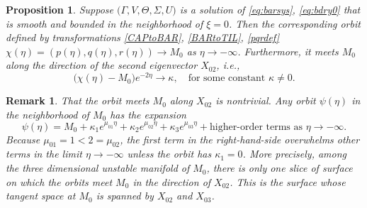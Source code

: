 \documentclass[a4paper,11pt]{article}
\newtheorem{proposition}{Proposition}[section]
\newtheorem{remark}{Remark}[section]
\begin{document}
\begin{proposition}
    Suppose $\big(\Gamma,V,\Theta,\Sigma,U\big)$ is a solution of \eqref{eq:barsys}, \eqref{eq:bdry0} that is smooth and bounded in the neighborhood of $\xi=0$. Then the corresponding orbit defined by transformations \eqref{CAPtoBAR}, \eqref{BARtoTIL}, \eqref{pqrdef} $\chi(\eta) = (p(\eta), q(\eta), r(\eta)) \rightarrow M_0$ as $\eta \rightarrow -\infty$. Furthermore, it meets $M_0$ along the direction of the second eigenvector $X_{02}$, i.e.,
    \begin{equation} \label{eq:alpha}
     \big(\chi(\eta) - M_0 \big)e^{-2\eta} \rightarrow \kappa, \quad \text{for some constant $\kappa\ne0$.}
    \end{equation}
\end{proposition}

\begin{remark} \label{rem:alpha}
  That the orbit meets $M_0$ along $X_{02}$ is nontrivial. Any orbit $\psi(\eta)$ in the neighborhood of $M_0$ has the expansion
  $$  \psi(\eta) = M_0 + \kappa_1 e^{\mu_{01}\eta} + \kappa_2 e^{\mu_{02}\eta} + \kappa_3 e^{\mu_{03}\eta} + \text{higher-order terms as $\eta \rightarrow -\infty$}.$$
  Because $\mu_{01}=1<2=\mu_{02}$, the first term in the right-hand-side overwhelms other terms in the limit $\eta \rightarrow -\infty$ unless the orbit has $\kappa_1=0$. More precisely, among the three dimensional unstable manifold of $M_0$, there is only one slice of surface on which the orbits meet $M_0$ in the direction of $X_{02}$. This is the surface whose tangent space at $M_0$ is spanned by $X_{02}$ and $X_{03}$.
\end{remark}
\end{document}
